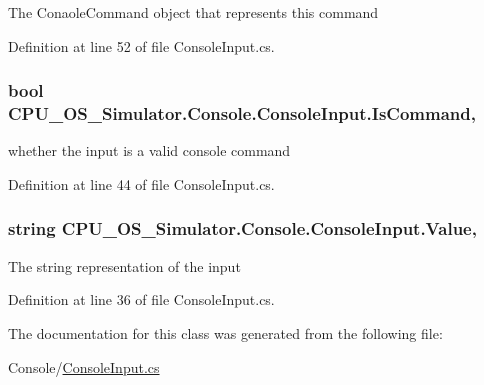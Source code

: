 The Conaole\+Command object that represents this command 



Definition at line 52 of file Console\+Input.\+cs.

\hypertarget{class_c_p_u___o_s___simulator_1_1_console_1_1_console_input_a41ebc5e7f419f80fe60ee45e54492d7e}{}
\subsubsection[{Is\+Command}]{\setlength{\rightskip}{0pt plus 5cm}bool C\+P\+U\+\_\+\+O\+S\+\_\+\+Simulator.\+Console.\+Console\+Input.\+Is\+Command\hspace{0.3cm}{\ttfamily [get]}, {\ttfamily [set]}}\label{class_c_p_u___o_s___simulator_1_1_console_1_1_console_input_a41ebc5e7f419f80fe60ee45e54492d7e}


whether the input is a valid console command 



Definition at line 44 of file Console\+Input.\+cs.

\hypertarget{class_c_p_u___o_s___simulator_1_1_console_1_1_console_input_a2ad81ef96300694cbfe63aa02d098bf2}{}
\subsubsection[{Value}]{\setlength{\rightskip}{0pt plus 5cm}string C\+P\+U\+\_\+\+O\+S\+\_\+\+Simulator.\+Console.\+Console\+Input.\+Value\hspace{0.3cm}{\ttfamily [get]}, {\ttfamily [set]}}\label{class_c_p_u___o_s___simulator_1_1_console_1_1_console_input_a2ad81ef96300694cbfe63aa02d098bf2}


The string representation of the input 



Definition at line 36 of file Console\+Input.\+cs.



The documentation for this class was generated from the following file\+:\begin{DoxyCompactItemize}
\item 
Console/\hyperlink{_console_input_8cs}{Console\+Input.\+cs}\end{DoxyCompactItemize}
